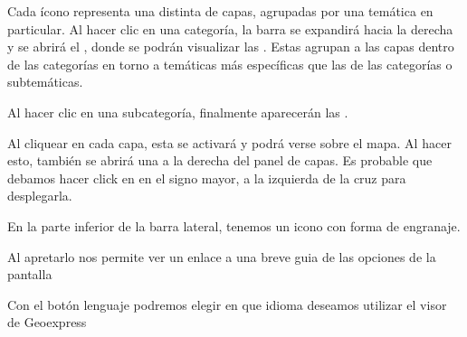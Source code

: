 \documentclass[a4paper,11pt,openany,spanish]{sphinxmanual}
\begin{document}

\sphinxAtStartPar
Cada ícono representa una  distinta de capas, agrupadas por una temática en particular. Al hacer clic en una categoría, la barra se expandirá hacia la derecha y se abrirá el , donde se podrán visualizar las .
Estas agrupan a las capas dentro de las categorías en torno a temáticas más específicas que las de las categorías o sub\sphinxhyphen{}temáticas.

\sphinxAtStartPar
Al hacer clic en una subcategoría, finalmente aparecerán las .


\sphinxAtStartPar
Al cliquear en cada capa, esta se activará y podrá verse sobre el mapa. Al hacer esto, también se abrirá una  a la derecha del panel de capas. Es probable que debamos hacer click en en el signo mayor, a la izquierda de la cruz para desplegarla.


\sphinxAtStartPar
En la parte inferior de la barra lateral, tenemos un icono con forma de engranaje.


\sphinxAtStartPar
Al apretarlo nos permite ver un enlace a una breve guia de las opciones de la pantalla


\sphinxAtStartPar
Con el botón lenguaje podremos elegir en que idioma deseamos utilizar el visor de Geoexpress


\sphinxstepscope
\end{document}
